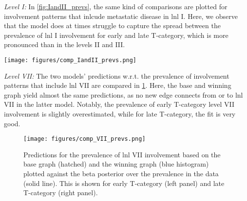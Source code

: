 \documentclass[twocolumn]{aastex631}
\begin{document}
{\it Level I:} In \cref{fig:IandII_prevs}, the same kind of comparisons are plotted for involvement patterns that inlcude metastatic disease in \gls{lnl} I. Here, we observe that the model does at times struggle to capture the spread between the prevalence of \gls{lnl} I involvement for early and late T-category, which is more pronounced than in the levels II and III.

\begin{figure*}
    \begin{centering}
        \texttt{[image: figures/comp\_IandII\_prevs.png]}
        \caption{Comparison of observed and predicted prevalences of \gls{lnl} I and II involvement patterns. The top and bottom panels show the prevalences for early and late T-category, respectively. The solid lines are Beta posteriors from the data, while the histograms are predicted prevalences (colored: winning graph, gray-hatched: base graph). Blue and red plots indicate overall \gls{lnl} I and II involvement, respectively. Green plots indicate \gls{lnl} I involvement without level II, while orange plots indicate the opposite (\gls{lnl} II without level I). The winning graph has an added edge from \gls{lnl} II to I, which improves the prediction of the rare green pattern and minimally reduces the overestimation of the orange pattern in late T-category.}
        \label{fig:IandII_prevs}
    \end{centering}
\end{figure*}

{\it Level VII:} The two models' predictions w.r.t. the prevalence of involvement patterns that include \gls{lnl} VII are compared in \cref{fig:VII_prevs}. Here, the base and winning graph yield almost the same predictions, as no new edge connects from or to \gls{lnl} VII in the latter model. Notably, the prevalence of early T-category level VII involvement is slightly overestimated, while for late T-category, the fit is very good.

\begin{figure}
    \begin{centering}
        \texttt{[image: figures/comp\_VII\_prevs.png]}
        \caption{Predictions for the prevalence of \gls{lnl} VII involvement based on the base graph (hatched) and the winning graph (blue histogram) plotted against the beta posterior over the prevalence in the data (solid line). This is shown for early T-category (left panel) and late T-category (right panel).}
        \label{fig:VII_prevs}
    \end{centering}
\end{figure}
\end{document}
